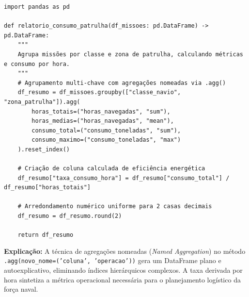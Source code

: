 \ifmostrarGabarito
\begin{verbatim}
import pandas as pd

def relatorio_consumo_patrulha(df_missoes: pd.DataFrame) -> pd.DataFrame:
    """
    Agrupa missões por classe e zona de patrulha, calculando métricas e consumo por hora.
    """
    # Agrupamento multi-chave com agregações nomeadas via .agg()
    df_resumo = df_missoes.groupby(["classe_navio", "zona_patrulha"]).agg(
        horas_totais=("horas_navegadas", "sum"),
        horas_medias=("horas_navegadas", "mean"),
        consumo_total=("consumo_toneladas", "sum"),
        consumo_maximo=("consumo_toneladas", "max")
    ).reset_index()
    
    # Criação de coluna calculada de eficiência energética
    df_resumo["taxa_consumo_hora"] = df_resumo["consumo_total"] / df_resumo["horas_totais"]
    
    # Arredondamento numérico uniforme para 2 casas decimais
    df_resumo = df_resumo.round(2)
    
    return df_resumo
\end{verbatim}

\textbf{Explicação:}
A técnica de agregações nomeadas (\emph{Named Aggregation}) no método \texttt{.agg(novo\_nome=('coluna', 'operacao'))} gera um DataFrame plano e autoexplicativo, eliminando índices hierárquicos complexos. A taxa derivada por hora sintetiza a métrica operacional necessária para o planejamento logístico da força naval.
\fi
